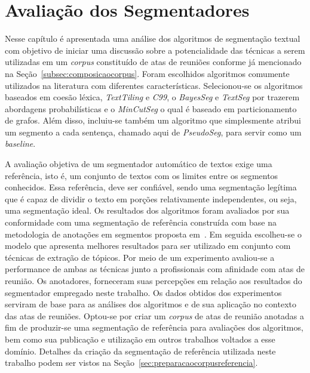\chapter{Avaliação dos Segmentadores}\label{cap-segmentadores}




Nesse capítulo é apresentada uma análise dos algoritmos de segmentação textual com objetivo de iniciar uma discussão sobre a potencialidade das técnicas a serem utilizadas em um \textit{corpus} constituído de atas de reuniões conforme já mencionado na Seção~\ref{subsec:composicaocorpus}. 
Foram escolhidos algoritmos comumente utilizados na literatura com diferentes características.  Selecionou-se os algoritmos baseados em coesão léxica, \textit{TextTiling} e \textit{C99}, o \textit{BayesSeg} e \textit{TextSeg} por trazerem abordagens probabilísticas e o \textit{MinCutSeg} o qual é baseado em particionamento de grafos.
% 
Além disso, incluiu-se também um algoritmo que simplesmente atribui um segmento a cada sentença, chamado aqui de \textit{PseudoSeg}, para servir como um \textit{baseline}.

A avaliação objetiva de um segmentador automático de textos exige uma referência, isto é, um conjunto de textos com os limites entre os segmentos conhecidos. Essa referência, deve ser confiável, sendo uma segmentação legítima que é capaz de dividir o texto em porções relativamente independentes, ou seja, uma segmentação ideal. 
%
Os resultados dos algoritmos foram avaliados por sua conformidade com uma segmentação de referência construída com base na metodologia de anotações em segmentos proposta em~\cite{Hovy2010}. 
Em seguida escolheu-se o modelo que apresenta melhores resultados para ser utilizado em conjunto com técnicas de extração de tópicos. Por meio de um experimento avaliou-se a performance de ambas as técnicas junto a profissionais com afinidade com atas de reunião. Os anotadores, forneceram suas percepções em relação aos resultados do segmentador empregado neste trabalho.  
Os dados obtidos dos experimentos serviram de base para as análises dos algoritmos e de sua aplicação no contexto das atas de reuniões. 
Optou-se por criar um \textit{corpus} de atas de reunião anotadas a fim de produzir-se uma segmentação de referência para avaliações dos algoritmos, bem como sua publicação e utilização em outros trabalhos voltados a esse domínio. 
Detalhes da criação da segmentação de referência utilizada neste trabalho podem ser vistos na Seção~\ref{sec:preparacaocorpusreferencia}.

